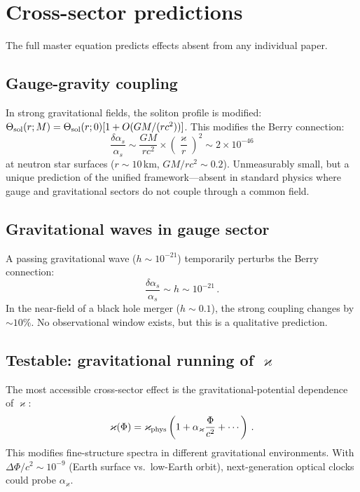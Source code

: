 \documentclass[twocolumn,preprintnumbers,amsmath,amssymb,prd]{revtex4-2}
\begin{document}
\section{Cross-sector predictions}
\label{sec:cross}

The full master equation predicts effects absent from any individual paper.

\subsection{Gauge-gravity coupling}

In strong gravitational fields, the soliton profile is modified: $\Theta_{\rm sol}(r;M) = \Theta_{\rm sol}(r;0)[1 + O(GM/(rc^2))]$.
This modifies the Berry connection:
\begin{equation}
\frac{\delta\alpha_s}{\alpha_s} \sim \frac{GM}{rc^2}\times\left(\frac{\varkappa}{r}\right)^2 \sim 2\times10^{-46}
\end{equation}
at neutron star surfaces ($r \sim 10\,$km, $GM/rc^2 \sim 0.2$).
Unmeasurably small, but a unique prediction of the unified framework---absent in standard physics where gauge and gravitational sectors do not couple through a common field.

\subsection{Gravitational waves in gauge sector}

A passing gravitational wave ($h \sim 10^{-21}$) temporarily perturbs the Berry connection:
\begin{equation}
\frac{\delta\alpha_s}{\alpha_s} \sim h \sim 10^{-21}\,.
\end{equation}
In the near-field of a black hole merger ($h \sim 0.1$), the strong coupling changes by $\sim 10\%$.
No observational window exists, but this is a qualitative prediction.

\subsection{Testable: gravitational running of $\varkappa$}

The most accessible cross-sector effect is the gravitational-potential dependence of $\varkappa$:
\begin{equation}
\varkappa(\Phi) = \varkappa_{\rm phys}\left(1 + \alpha_\varkappa\frac{\Phi}{c^2} + \cdots\right)\,.
\end{equation}
This modifies fine-structure spectra in different gravitational environments.
With $\Delta\Phi/c^2 \sim 10^{-9}$ (Earth surface vs.\ low-Earth orbit), next-generation optical clocks could probe $\alpha_\varkappa$.
\end{document}
